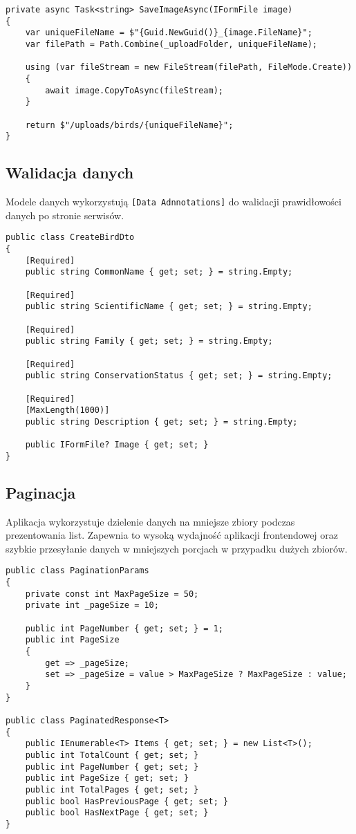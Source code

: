 \begin{lstlisting}[style=csharp, caption={Fragment implementacji zapisu plików}]
private async Task<string> SaveImageAsync(IFormFile image)
{
	var uniqueFileName = $"{Guid.NewGuid()}_{image.FileName}";
	var filePath = Path.Combine(_uploadFolder, uniqueFileName);
	
	using (var fileStream = new FileStream(filePath, FileMode.Create))
	{
		await image.CopyToAsync(fileStream);
	}
	
	return $"/uploads/birds/{uniqueFileName}";
}
\end{lstlisting}

\subsection{Walidacja danych}
Modele danych wykorzystują \texttt{[Data Adnnotations]} do walidacji prawidłowości danych po stronie serwisów.

\begin{lstlisting}[style=csharp, caption={Przykład stosowania adnotacji w modelu DTO}]
public class CreateBirdDto
{
	[Required]
	public string CommonName { get; set; } = string.Empty;
	
	[Required]
	public string ScientificName { get; set; } = string.Empty;
	
	[Required]
	public string Family { get; set; } = string.Empty;
	
	[Required]
	public string ConservationStatus { get; set; } = string.Empty;
	
	[Required]
	[MaxLength(1000)]
	public string Description { get; set; } = string.Empty;
	
	public IFormFile? Image { get; set; }
}
\end{lstlisting}

\subsection{Paginacja}
Aplikacja wykorzystuje dzielenie danych na mniejsze zbiory podczas prezentowania list. Zapewnia to wysoką wydajność aplikacji frontendowej oraz szybkie przesyłanie danych w mniejszych porcjach w przypadku dużych zbiorów.

\begin{lstlisting}[style=csharp, caption={Implementacja paginacji po stronie backendu}]
public class PaginationParams
{
	private const int MaxPageSize = 50;
	private int _pageSize = 10;
	
	public int PageNumber { get; set; } = 1;
	public int PageSize
	{
		get => _pageSize;
		set => _pageSize = value > MaxPageSize ? MaxPageSize : value;
	}
}

public class PaginatedResponse<T>
{
	public IEnumerable<T> Items { get; set; } = new List<T>();
	public int TotalCount { get; set; }
	public int PageNumber { get; set; }
	public int PageSize { get; set; }
	public int TotalPages { get; set; }
	public bool HasPreviousPage { get; set; }
	public bool HasNextPage { get; set; }
}
\end{lstlisting}

